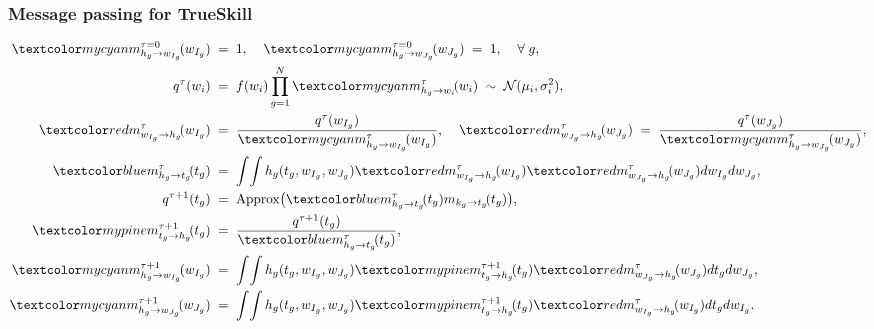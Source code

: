 \begin{frame}
\frametitle{Message passing for TrueSkill}

\[
\begin{split}
\Cyan{m^{\tau=0}_{h_g\rightarrow w_{I_g}}\!(w_{I_g})}\;&=\;1,\;\;\;\;
\Cyan{m^{\tau=0}_{h_g\rightarrow w_{J_g}}\!(w_{J_g})}\;=\;1,\;\;\;\;\forall\;g,\\
q^\tau(w_i)\;&=\;f(w_i)\prod_{g=1}^N \Cyan{m^\tau_{h_g\rightarrow w_i}\!(w_i)}
\;\sim\;\N(\mu_i,\sigma^2_i),\\
\Red{m^\tau_{w_{I_g}\rightarrow h_g}\!(w_{I_g})}\;&=\;
\frac{q^\tau(w_{I_g})}{\Cyan{m^\tau_{h_g\rightarrow w_{I_g}}\!(w_{I_g})}},\;\;\;\;
\Red{m^\tau_{w_{J_g}\rightarrow h_g}\!(w_{J_g})}\;=\;
\frac{q^\tau(w_{J_g})}{\Cyan{m^\tau_{h_g\rightarrow w_{J_g}}\!(w_{J_g})}},\\
\Blue{m^\tau_{h_g\rightarrow t_g}\!(t_g)}\;&=\;
\int\!\int h_g(t_g,w_{I_g},w_{J_g}) \Red{m^\tau_{w_{I_g}\rightarrow h_g}\!(w_{I_g})}
\Red{m^\tau_{w_{J_g}\rightarrow h_g}\!(w_{J_g})}dw_{I_g}dw_{J_g},\\
q^{\tau+1}(t_g)\;&=\;{\rm Approx}
\big(\Blue{m^\tau_{h_g\rightarrow t_g}\!(t_g)}m_{k_g\rightarrow t_g}\!(t_g)\big),\\
\Green{m^{\tau+1}_{t_g\rightarrow h_g}\!(t_g)}\;&=\;
\frac{q^{\tau+1}(t_g)}{\Blue{m^\tau_{h_g\rightarrow t_g}\!(t_g)}},\\
\Cyan{m^{\tau+1}_{h_g\rightarrow w_{I_g}}\!(w_{I_g})}\;&=\;\int\!\int
h_g(t_g,w_{I_g},w_{J_g})\Green{m^{\tau+1}_{t_g\rightarrow h_g}\!(t_g)}
\Red{m^\tau_{w_{J_g}\rightarrow h_g}\!(w_{J_g})}dt_gdw_{J_g},\\
\Cyan{m^{\tau+1}_{h_g\rightarrow w_{J_g}}\!(w_{J_g})}\;&=\;\int\!\int
h_g(t_g,w_{I_g},w_{J_g})\Green{m^{\tau+1}_{t_g\rightarrow h_g}\!(t_g)}
\Red{m^\tau_{w_{I_g}\rightarrow h_g}\!(w_{I_g})}dt_gdw_{I_g}.
\end{split}
\]
\end{frame}


